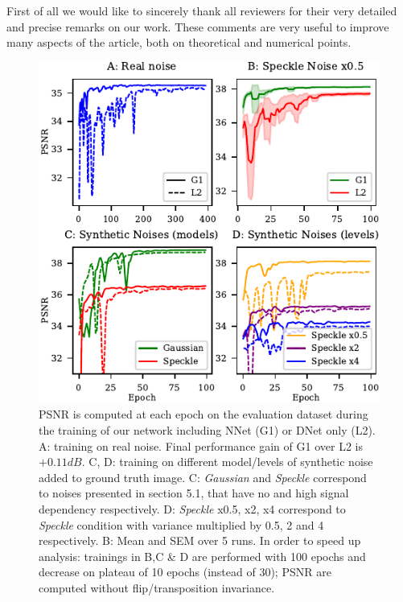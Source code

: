 \documentclass{article}
\begin{document}

First of all we would like to sincerely thank all reviewers for their very detailed and precise remarks on our work. These comments are very useful to improve many aspects of the article, both on theoretical and numerical points.
\begin{figure}[H]
\vskip -0.1in
\begin{center}
\includegraphics[width=\columnwidth]{fig_review.pdf}
\vskip -0.15in
\caption{PSNR is computed at each epoch on the evaluation dataset during the training of our network including NNet (G1) or DNet only (L2). A: training on real noise. Final performance gain of G1 over L2 is $+0.11dB$. C, D: training on different model/levels of synthetic noise added to ground truth image. C: \textit{Gaussian} and \textit{Speckle} correspond to noises presented in section 5.1, that have no and high signal dependency respectively. D: \textit{Speckle} x0.5, x2, x4 correspond to \textit{Speckle} condition with variance multiplied by 0.5, 2 and 4 respectively. B: Mean and SEM over 5 runs. In order to speed up analysis: trainings in B,C \& D are performed with 100 epochs and decrease on plateau of 10 epochs (instead of 30); PSNR are computed without flip/transposition invariance.}
\label{fig:review}
\end{center}
\vskip -0.25in
\end{figure}
\end{document}

